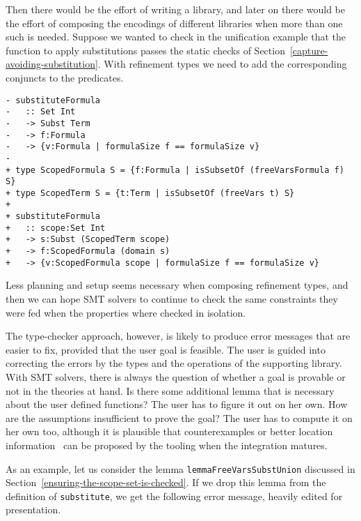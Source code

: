 \documentclass[sigconf, anonymous, review]{acmart}
\newcommand{\tc}[1]{{\small\texttt{#1}}}
\begin{document}
Then there would be the effort of writing a library, and later on there would be the
effort of composing the encodings of different libraries when more than one such
is needed. Suppose we wanted to check in the unification example that the
function to apply substitutions passes the static checks of
Section~\ref{capture-avoiding-substitution}. With
refinement types we need to add the corresponding conjuncts to the predicates.

\begin{verbatim}
- substituteFormula
-   :: Set Int
-   -> Subst Term
-   -> f:Formula
-   -> {v:Formula | formulaSize f == formulaSize v}
-
+ type ScopedFormula S = {f:Formula | isSubsetOf (freeVarsFormula f) S}
+ type ScopedTerm S = {t:Term | isSubsetOf (freeVars t) S}
+
+ substituteFormula
+   :: scope:Set Int
+   -> s:Subst (ScopedTerm scope)
+   -> f:ScopedFormula (domain s)
+   -> {v:ScopedFormula scope | formulaSize f == formulaSize v}
\end{verbatim}

Less planning and setup seems necessary when composing refinement types, and
then we can hope SMT solvers to continue to check the same constraints
they were fed when the properties where checked in isolation.

The type-checker approach, however, is likely to produce error messages that
are easier to fix, provided that the user goal is feasible.
The user is guided into correcting the errors
by the types and the operations of the supporting library. With SMT solvers,
there is always the question of whether a goal is provable or not in the
theories at hand. Is there some additional lemma that is necessary about the user defined
functions? The user has to figure it out on her own. How are the assumptions
insufficient to prove the goal? The user has to compute it on her own too,
although it is plausible that counterexamples or better location information~\cite{webbers24}
can be proposed by the tooling when the integration matures.

As an example, let us consider the lemma \tc{lemma\-FreeVars\-Subst\-Union} discussed in
Section~\ref{ensuring-the-scope-set-is-checked}.
If we drop this lemma from the definition of \tc{substitute}, we get the following
error message, heavily edited for presentation.
\end{document}
